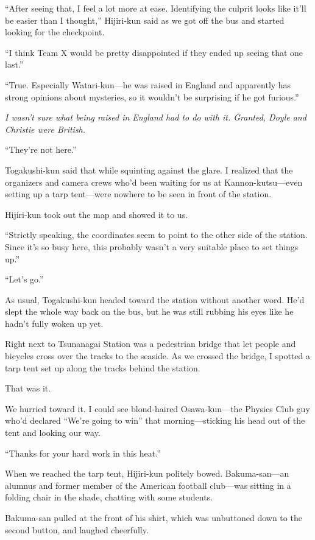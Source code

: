 \documentclass[
    a4paper,
    12pt,
    twoside,
    openany,
    UTF8,
    fontset=windows
]{ctexbook}
\begin{document}
``After seeing that, I feel a lot more at ease. Identifying the culprit looks like it'll be easier than I thought,'' Hijiri-kun said as we got off the bus and started looking for the checkpoint.

``I think Team X would be pretty disappointed if they ended up seeing that one last.''

``True. Especially Watari-kun---he was raised in England and apparently has strong opinions about mysteries, so it wouldn't be surprising if he got furious.''

\textit{I wasn't sure what being raised in England had to do with it. Granted, Doyle and Christie were British.}

``They're not here.''

Togakushi-kun said that while squinting against the glare. I realized that the organizers and camera crews who'd been waiting for us at Kannon-kutsu---even setting up a tarp tent---were nowhere to be seen in front of the station.

Hijiri-kun took out the map and showed it to us.

``Strictly speaking, the coordinates seem to point to the other side of the station. Since it's so busy here, this probably wasn't a very suitable place to set things up.''

``Let's go.''

As usual, Togakushi-kun headed toward the station without another word. He'd slept the whole way back on the bus, but he was still rubbing his eyes like he hadn't fully woken up yet.

Right next to Tsunanagai Station was a pedestrian bridge that let people and bicycles cross over the tracks to the seaside. As we crossed the bridge, I spotted a tarp tent set up along the tracks behind the station.

That was it.

We hurried toward it. I could see blond-haired Osawa-kun---the Physics Club guy who'd declared ``We're going to win'' that morning---sticking his head out of the tent and looking our way.

``Thanks for your hard work in this heat.''

When we reached the tarp tent, Hijiri-kun politely bowed. Bakuma-san---an alumnus and former member of the American football club---was sitting in a folding chair in the shade, chatting with some students.

Bakuma-san pulled at the front of his shirt, which was unbuttoned down to the second button, and laughed cheerfully.
\end{document}
